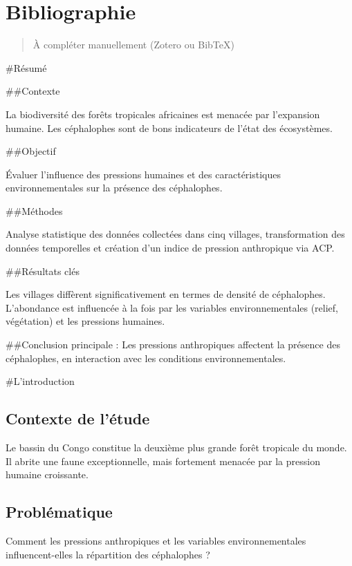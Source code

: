 \documentclass[
]{article}
\begin{document}
\section{Bibliographie}\label{bibliographie}

\begin{quote}
À compléter manuellement (Zotero ou BibTeX)
\end{quote}

\#Résumé

\#\#Contexte

La biodiversité des forêts tropicales africaines est menacée par l'expansion humaine. Les céphalophes sont de bons indicateurs de l'état des écosystèmes.

\#\#Objectif

Évaluer l'influence des pressions humaines et des caractéristiques environnementales sur la présence des céphalophes.

\#\#Méthodes

Analyse statistique des données collectées dans cinq villages, transformation des données temporelles et création d'un indice de pression anthropique via ACP.

\#\#Résultats clés

Les villages diffèrent significativement en termes de densité de céphalophes. L'abondance est influencée à la fois par les variables environnementales (relief, végétation) et les pressions humaines.

\#\#Conclusion principale : Les pressions anthropiques affectent la présence des céphalophes, en interaction avec les conditions environnementales.

\#L'introduction

\subsection{Contexte de l'étude}\label{contexte-de-luxe9tude}

Le bassin du Congo constitue la deuxième plus grande forêt tropicale du monde. Il abrite une faune exceptionnelle, mais fortement menacée par la pression humaine croissante.

\subsection{Problématique}\label{probluxe9matique-1}

Comment les pressions anthropiques et les variables environnementales influencent-elles la répartition des céphalophes ?
\end{document}
